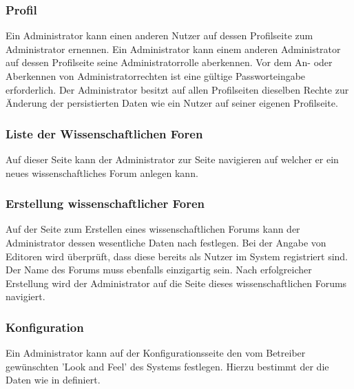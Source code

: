 \subsubsection{Profil}
\begin{description}
     Ein Administrator kann einen anderen Nutzer auf dessen Profilseite zum Administrator ernennen.
     Ein Administrator kann einem anderen Administrator auf dessen Profilseite seine
    Administratorrolle aberkennen.
     Vor dem An- oder Aberkennen von Administratorrechten ist eine gültige
    Passworteingabe erforderlich.
     Der Administrator besitzt auf allen Profilseiten dieselben Rechte zur Änderung
    der persistierten Daten wie ein Nutzer auf seiner eigenen Profilseite. %
\end{description}

\subsubsection{Liste der Wissenschaftlichen Foren}
\begin{description}
     Auf dieser Seite kann der Administrator zur Seite navigieren auf welcher er ein neues
    wissenschaftliches Forum anlegen kann. %
\end{description}

\subsubsection{Erstellung wissenschaftlicher Foren}
\begin{description}
     Auf der Seite zum Erstellen eines wissenschaftlichen Forums kann der Administrator dessen
    wesentliche Daten nach  %
    festlegen. Bei der Angabe von Editoren wird überprüft, dass diese bereits als Nutzer im System registriert sind.
    Der Name des Forums muss ebenfalls einzigartig sein.
    Nach erfolgreicher Erstellung wird der Administrator auf die Seite dieses wissenschaftlichen Forums
    navigiert.
\end{description}

\subsubsection{Konfiguration}
\begin{description}
     Ein Administrator kann auf der Konfigurationsseite den vom Betreiber gewünschten
    'Look and Feel' des Systems festlegen. Hierzu bestimmt der die Daten wie in definiert. %
\end{description}